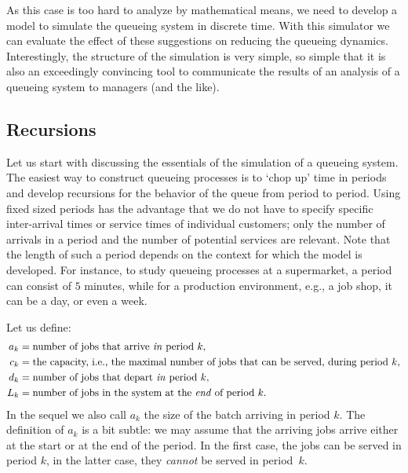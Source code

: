 As this case is too hard to analyze by mathematical means,  we need to develop a model to simulate the queueing system in discrete time. 
With this simulator we can evaluate the effect of these suggestions on reducing the queueing dynamics.
Interestingly, the structure of the simulation is very simple, so simple that it is also an exceedingly convincing tool to communicate the results of an analysis of a queueing system to managers (and the like).

\subsection*{Recursions}

Let us start with discussing the essentials of the simulation of a queueing system.
The easiest way to construct queueing processes is to `chop up' time in periods and develop recursions for the behavior of the queue from period to period.
Using fixed sized periods has the advantage that we do not have to specify specific inter-arrival times or service times of individual customers; only the number of arrivals in a period and the number of potential services are relevant.
Note that the length of such a period depends on the context for which the model is developed.
For instance, to study queueing processes at a supermarket, a period can consist of $5$ minutes, while for a production environment, e.g., a job shop, it can be a day, or even a week.


Let us define:
\begin{equation}
  \label{eq:30}
  \begin{split}
    a_k &= \text{number of jobs that arrive \textit{in} period $k$},\\
    c_k &= \text{the capacity, i.e., the maximal number of jobs that can be served, during period $k$},\\
    d_k &= \text{number of jobs that depart  \textit{in} period $k$},\\
    L_k &= \text{number of jobs in the system  at the \textit{end} of period $k$}.\\
  \end{split}
\end{equation}
In the sequel we also call $a_k$ the size of the batch arriving in
period $k$. The definition of $a_k$ is a bit subtle: we may assume
that the arriving jobs arrive either at the start or at the end of the
period. In the first case, the jobs can be served in period $k$,
in the latter case, they \emph{cannot} be served in period~$k$.


